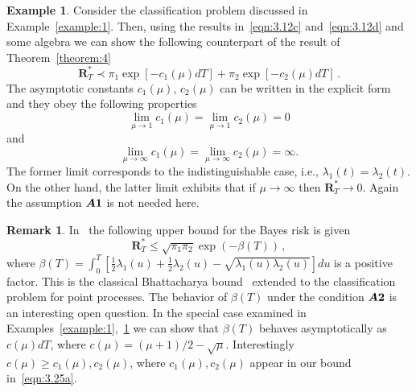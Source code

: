 \documentclass[lettersize,journal,onecolumn]{IEEEtran}
\theoremstyle{definition}
\newtheorem{remark}{Remark}
\newtheorem{example}{Example}
\newcommand{\assumption}[1]{{\rm \boldsymbol{A#1}}}
\begin{document}
\begin{example} 
	\label{example:2}
	Consider the classification problem discussed in Example~\ref{example:1}. 
	Then, using the results in~\eqref{eqn:3.12c} and~\eqref{eqn:3.12d} and some algebra
	we can show the following counterpart of the result of Theorem~\ref{theorem:4}
	\begin{equation}
		\mathbf{R}_{T}^{*} \prec 
		\pi_1 \exp\left[-c_{1}(\mu)dT\right] + 
		\pi_2 \exp\left[-c_{2}(\mu)dT\right]
		\label{eqn:3.25a}\,.
	\end{equation}
	The asymptotic constants $c_1 (\mu )$, $c_2 (\mu)$ can be written in the explicit
	form and they obey the following properties
	\begin{equation*}
		\lim_{\mu \to 1} c_1 (\mu ) = \lim_{\mu \to 1} c_2 (\mu ) = 0
	\end{equation*}
	and
	\begin{equation*}
		\lim_{\mu \to \infty} c_1 (\mu ) = \lim_{\mu \to \infty} c_2 (\mu ) = \infty. 
	\end{equation*}
	The former limit corresponds to the indistinguishable case, i.e., 
	$\lambda_1(t) = \lambda_2(t)$. On the other hand, the latter limit exhibits that
	if $\mu \to \infty$ then $\mathbf{R}_{T}^{*} \to 0$. Again the assumption
	$\assumption{1}$ is not needed here.
\end{example}

\begin{remark}
	\label{remark:3}
	In~\cite{rong2021error} the following upper bound for the Bayes risk is given
	\begin{equation*}
		\mathbf{R}_{T}^{*} \leq
		\sqrt{\pi_{1}\pi_{2}} \exp\left(-\beta(T)\right)
		\,,
	\end{equation*}
	where \mbox{$
		\beta(T) = \int_{0}^{T} \left[
		\frac{1}{2} \lambda_{1}(u) + \frac{1}{2} \lambda_{2}(u) -
		\sqrt{\lambda_{1}(u)\lambda_{2}(u)}
		\right]	du
		$} is a positive factor. This is the
	classical Bhattacharya bound~\cite{devroye2013probabilistic} extended to the
	classification problem for point processes. The behavior of $\beta(T)$ under the
	condition $\assumption{2}$ is an interesting open question.
	In the special case examined in Examples~\ref{example:1},~\ref{example:2}
	we can show that $\beta(T)$ behaves asymptotically as $c(\mu )dT$, where \mbox{$
		c(\mu ) = (\mu +1)/2 - \sqrt{\mu}
		$}. Interestingly $c(\mu ) \geq  c_1 (\mu ), c_2 (\mu)$, where 
	$c_1 (\mu), c_2 (\mu )$ appear in our bound in~\eqref{eqn:3.25a}.
\end{remark}
\end{document}
